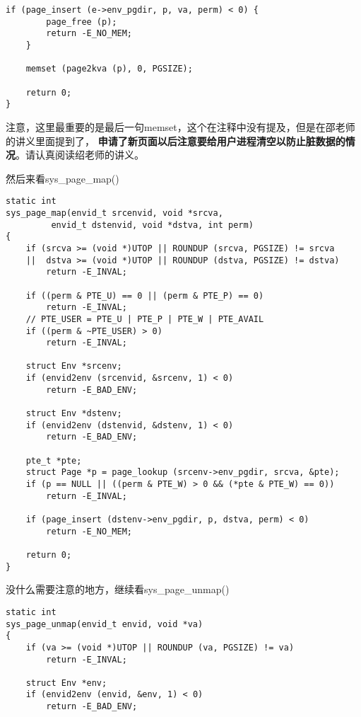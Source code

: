 \documentclass{article}
\newcommand{\highlight}[1]{{\bfseries \color{red}  #1}}
\newcommand{\funcname}[1]{{\ttfamily \small #1}}
\begin{document}
\begin{CJK*}{UTF8}{gkai}
\begin{lstlisting}[style=ccode, title={\scriptsize \ttfamily \bfseries kern/syscall.c: sys\_page\_alloc()}]
    if (page_insert (e->env_pgdir, p, va, perm) < 0) {
        page_free (p);
        return -E_NO_MEM;
    }

    memset (page2kva (p), 0, PGSIZE);

    return 0;
}
\end{lstlisting}

注意，这里最重要的是最后一句memset，这个在注释中没有提及，但是在邵老师的讲义里面提到了，\highlight{申请了新页面以后注意要给用户进程清空以防止脏数据的情况}。请认真阅读绍老师的讲义。

然后来看\funcname{sys\_page\_map()}

\begin{lstlisting}[style=ccode, title={\scriptsize \ttfamily \bfseries kern/syscall.c: sys\_page\_map()}]
static int
sys_page_map(envid_t srcenvid, void *srcva,
	     envid_t dstenvid, void *dstva, int perm)
{
    if (srcva >= (void *)UTOP || ROUNDUP (srcva, PGSIZE) != srcva
    ||  dstva >= (void *)UTOP || ROUNDUP (dstva, PGSIZE) != dstva)
        return -E_INVAL;

    if ((perm & PTE_U) == 0 || (perm & PTE_P) == 0)
        return -E_INVAL;
    // PTE_USER = PTE_U | PTE_P | PTE_W | PTE_AVAIL
    if ((perm & ~PTE_USER) > 0)
        return -E_INVAL;

    struct Env *srcenv;
    if (envid2env (srcenvid, &srcenv, 1) < 0)
        return -E_BAD_ENV;

    struct Env *dstenv;
    if (envid2env (dstenvid, &dstenv, 1) < 0)
        return -E_BAD_ENV;

    pte_t *pte;
    struct Page *p = page_lookup (srcenv->env_pgdir, srcva, &pte);
    if (p == NULL || ((perm & PTE_W) > 0 && (*pte & PTE_W) == 0))
        return -E_INVAL;

    if (page_insert (dstenv->env_pgdir, p, dstva, perm) < 0)
        return -E_NO_MEM;

    return 0;
}
\end{lstlisting}

没什么需要注意的地方，继续看\funcname{sys\_page\_unmap()}


\begin{lstlisting}[style=ccode, title={\scriptsize \ttfamily \bfseries kern/syscall.c: sys\_page\_unmap()}]
static int
sys_page_unmap(envid_t envid, void *va)
{
    if (va >= (void *)UTOP || ROUNDUP (va, PGSIZE) != va)
        return -E_INVAL;

    struct Env *env;
    if (envid2env (envid, &env, 1) < 0)
        return -E_BAD_ENV;


\end{lstlisting}
\end{CJK*}
\end{document}
